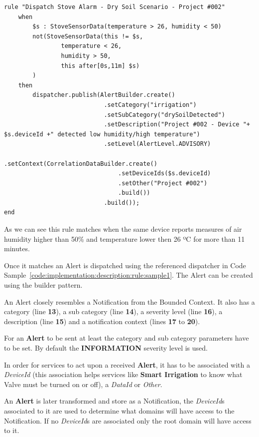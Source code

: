 \begin{lstlisting}[caption=Rule Scenario Example - Part 3, label={code:implementation:description:rule:sample3}]
rule "Dispatch Stove Alarm - Dry Soil Scenario - Project #002"
    when
        $s : StoveSensorData(temperature > 26, humidity < 50)
        not(StoveSensorData(this != $s,
                temperature < 26,
                humidity > 50,
                this after[0s,11m] $s)
        )
    then 
        dispatcher.publish(AlertBuilder.create()
                            .setCategory("irrigation")
                            .setSubCategory("drySoilDetected")
                            .setDescription("Project #002 - Device "+ $s.deviceId +" detected low humidity/high temperature")
                            .setLevel(AlertLevel.ADVISORY)
                            .setContext(CorrelationDataBuilder.create()
                                .setDeviceIds($s.deviceId)
                                .setOther("Project #002")
                                .build())
                            .build());
end
\end{lstlisting}

As we can see this rule matches when the same device reports measures of air humidity higher than 50\% and temperature lower then 26 ºC for more than 11 minutes.

Once it matches an Alert is dispatched using the referenced dispatcher in Code Sample~\ref{code:implementation:description:rule:sample1}. The Alert can be created using the builder pattern.

An Alert closely resembles a Notification from the  Bounded Context. It also has a category (line \textbf{13}), a sub category (line \textbf{14}), a severity level (line \textbf{16}), a description (line \textbf{15}) and a notification context (lines \textbf{17} to \textbf{20}).

For an \textbf{Alert} to be sent at least the category and sub category parameters have to be set. By default the \textbf{INFORMATION} severity level is used.

In order for services to act upon a received \textbf{Alert}, it has to be associated with a \textit{DeviceId} (this association helps services like \textbf{Smart Irrigation} to know what Valve must be turned on or off), a \textit{DataId} or \textit{Other}.

An \textbf{Alert} is later transformed and store as a Notification, the \textit{DeviceId}s associated to it are used to determine what domains will have access to the Notification. If no \textit{DeviceId}s are associated only the root domain will have access to it.

